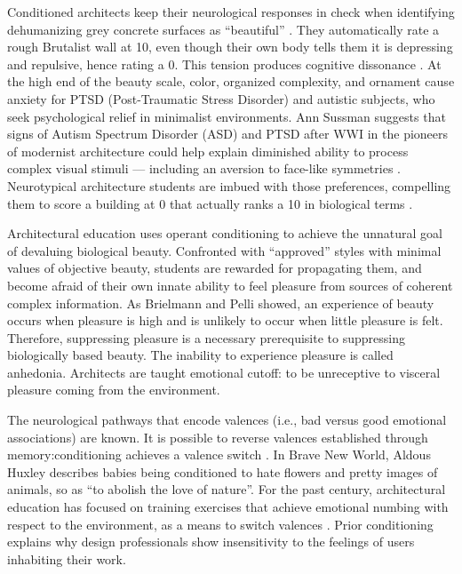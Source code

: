 \documentclass[a4paper]{article}
\begin{document}
Conditioned architects keep their neurological responses in check when identifying dehumanizing grey concrete surfaces as “beautiful” \cite{curl_duel_2019}. They automatically rate a rough Brutalist wall at 10, even though their own body tells them it is depressing and repulsive, hence rating a 0. This tension produces cognitive dissonance \cite{salingaros_cognitive_2014}. At the high end of the beauty scale, color, organized complexity, and ornament cause anxiety for PTSD (Post-Traumatic Stress Disorder) and autistic subjects, who seek psychological relief in minimalist environments. Ann Sussman suggests that signs of Autism Spectrum Disorder (ASD) and PTSD after WWI in the pioneers of modernist architecture could help explain diminished ability to process complex visual stimuli — including an aversion to face-like symmetries \cite{sussman_eye-tracking_2019, hollander_urban_2020}. Neurotypical architecture students are imbued with those preferences, compelling them to score a building at 0 that actually ranks a 10 in biological terms \cite{salingaros_what_2017,salingaros_theory_2008, salingaros_cognitive_2014}.

Architectural education uses operant conditioning to achieve the unnatural goal of devaluing biological beauty. Confronted with “approved” styles with minimal values of objective beauty, students are rewarded for propagating them, and become afraid of their own innate ability to feel pleasure from sources of coherent complex information. As Brielmann and Pelli \cite{brielmann_intense_2019} showed, an experience of beauty occurs when pleasure is high and is unlikely to occur when little pleasure is felt. Therefore, suppressing pleasure is a necessary prerequisite to suppressing biologically based beauty. The inability to experience pleasure is called anhedonia. Architects are taught emotional cutoff: to be unreceptive to visceral pleasure coming from the environment.

The neurological pathways that encode valences (i.e., bad versus good emotional associations) are known. It is possible to reverse valences established through memory:conditioning achieves a valence switch \cite{redondo_bidirectional_2014}. In Brave New World, Aldous Huxley describes babies being conditioned to hate flowers and pretty images of animals, so as “to abolish the love of nature”. For the past century, architectural education has focused on training exercises that achieve emotional numbing with respect to the environment, as a means to switch valences \cite{salingaros_what_2017}. Prior conditioning explains why design professionals show insensitivity to the feelings of users inhabiting their work.
\end{document}
